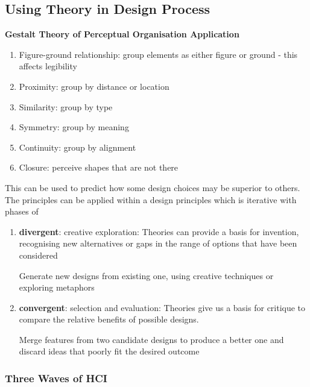 \documentclass{article}
\newenvironment{example}{\par\color{brown}}{\par}
\begin{document}
\subsection{Using Theory in Design Process}
\textbf{Gestalt Theory of Perceptual Organisation Application}
\begin{enumerate}
    \item Figure-ground relationship: group elements as either figure or ground - this affects legibility
    \item Proximity: group by distance or location
    \item Similarity: group by type
    \item Symmetry: group by meaning
    \item Continuity: group by alignment
    \item Closure: perceive shapes that are not there
\end{enumerate}

This can be used to predict how some design choices may be superior to others. The principles can be applied within a design principles which is iterative with phases of
\begin{enumerate}
    \item \textbf{divergent}: creative exploration: Theories can provide a basis for invention, recognising new alternatives or gaps in the range of options that have been considered
    
    \begin{example}
    Generate new designs from existing one, using creative techniques or exploring metaphors
    \end{example}
    
    \item \textbf{convergent}: selection and evaluation: Theories give us a basis for critique to compare the relative benefits of possible designs.
    
    \begin{example}
    Merge features from two candidate designs to produce a better one and discard ideas that poorly fit the desired outcome
    \end{example}
\end{enumerate}
 

\subsubsection{Three Waves of HCI}
\end{document}
